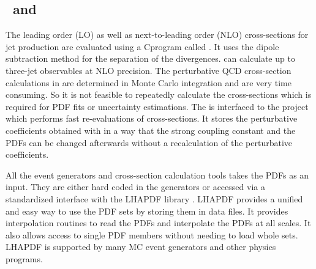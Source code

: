 \subsection{\NLOJET~and \fastNLO}
The leading order (LO) as well as next-to-leading order (NLO) cross-sections for jet production are evaluated using a C\plusn\plus program called \NLOJETPP \cite{Nagy:2001fj,Nagy:2003tz}. It uses the dipole subtraction method for the separation of the divergences. \NLOJETPP can calculate up to three-jet observables at NLO precision. The perturbative QCD cross-section calculations in \NLOJETPP are determined in Monte Carlo integration and are very time consuming. So it is not feasible to repeatedly calculate the cross-sections which is required for PDF fits or uncertainty estimations. The \NLOJETPP is interfaced to the \fastNLO project \cite{Kluge:2006xs,Britzger:2012bs} which performs fast re-evaluations of cross-sections. It stores the perturbative coefficients obtained with \NLOJETPP in a way that the strong coupling constant and the PDFs can be changed afterwards without a recalculation of the perturbative coefficients.

All the event generators and cross-section calculation tools takes the PDFs as an input. They are either hard coded in the generators or accessed via a standardized interface with the LHAPDF library \cite{Whalley:2005nh,Buckley:2014ana}. LHAPDF provides a unified and easy way to use the PDF sets by storing them in data files. It provides interpolation routines to read the PDFs and interpolate the PDFs at all scales. It also allows access to single PDF members without needing to load whole sets. LHAPDF is supported by many MC event generators and other physics programs.

